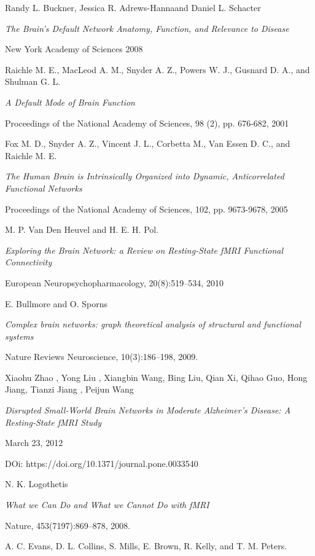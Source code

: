 \documentclass[12pt,openright,twoside,a4paper]{book}
\begin{document}
\begin{thebibliography}{99}

Randy L. Buckner, Jessica R. Adrews-Hannaand Daniel L. Schacter

\emph{The Brain’s Default Network Anatomy, Function, and Relevance to Disease}

New York Academy of Sciences 2008

Raichle M. E., MacLeod A. M., Snyder A. Z., Powers W. J., Gusnard D. A., and Shulman G. L.

\emph{A Default Mode of Brain Function}

Proceedings of the National Academy of Sciences, 98 (2), pp. 676-682, 2001

Fox M. D., Snyder A. Z., Vincent J. L., Corbetta M., Van Essen D. C., and Raichle M. E.

\emph{The Human Brain is Intrinsically Organized into Dynamic, Anticorrelated Functional Networks}

Proceedings of the National Academy of Sciences, 102, pp. 9673-9678, 2005

M. P. Van Den Heuvel and H. E. H. Pol.

\emph{Exploring the Brain Network: a Review on Resting-State fMRI Functional Connectivity}

European Neuropsychopharmacology, 20(8):519–534, 2010

E. Bullmore and O. Sporns

\emph{ Complex brain networks: graph theoretical analysis of structural and functional systems}

 Nature Reviews Neuroscience, 10(3):186–198, 2009.

Xiaohu Zhao , Yong Liu , Xiangbin Wang, Bing Liu, Qian Xi, Qihao Guo, Hong Jiang, Tianzi Jiang , Peijun Wang 

\emph{Disrupted Small-World Brain Networks in Moderate Alzheimer's Disease: A Resting-State fMRI Study}

March 23, 2012

DOi: https://doi.org/10.1371/journal.pone.0033540

N. K. Logothetis

\emph{ What we Can Do and What we Cannot Do with fMRI}

Nature, 453(7197):869–878, 2008.

A. C. Evans, D. L. Collins, S. Mills, E. Brown, R. Kelly, and T. M. Peters.


\end{thebibliography}
\end{document}
